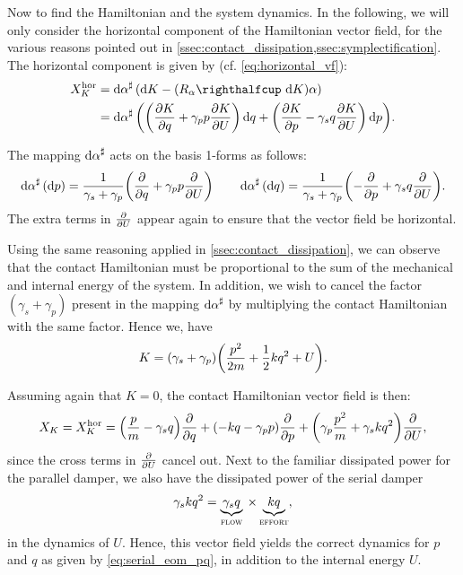 Now to find the Hamiltonian and the system dynamics. In the following, we will only consider the horizontal component of the Hamiltonian vector field, for the various reasons pointed out in \cref{ssec:contact_dissipation,ssec:symplectification}. The horizontal component is given by (cf. \cref{eq:horizontal_vf}):
\begin{equation}
    \begin{split}
        X^\text{hor}_K &= \fromDual{\dd{\alpha}}\qty(\dd{K} - (\intpr{R_\alpha}{\dd{K}})\alpha) \\
                       &= \fromDual{\dd{\alpha}}\qty(\qty(\pdv{K}{q} + \gamma_p p \pdv{K}{U})\dd{q} + \qty(\pdv{K}{p} - \gamma_s q \pdv{K}{U})\dd{p}).
    \end{split}
\end{equation}

The mapping $\dd{\alpha}^\sharp$ acts on the basis 1-forms as follows:
$$ 
    \dd{\alpha}^\sharp(\dd{p}) = \frac{1}{\gamma_s + \gamma_p}\qty(\pdv{}{q} + \gamma_p p\pdv{}{U}) \qquad
    \dd{\alpha}^\sharp(\dd{q}) = \frac{1}{\gamma_s + \gamma_p}\qty(-\pdv{}{p} + \gamma_s q\pdv{}{U}).
$$
The extra terms in $\pdv{}{U}$ appear again to ensure that the vector field be horizontal.

Using the same reasoning applied in \cref{ssec:contact_dissipation}, we can observe that the contact Hamiltonian must be proportional to the sum of the mechanical and internal energy of the system. In addition, we wish to cancel the factor $(\gamma_s + \gamma_p)$ present in the mapping $\dd{\alpha}^\sharp$ by multiplying the contact Hamiltonian with the same factor. Hence we, have
$$ 
    K = (\gamma_s + \gamma_p)\qty(\frac{p^2}{2m} + \frac{1}{2}kq^2 + U). 
$$

Assuming again that $K = 0$, the contact Hamiltonian vector field is then:
$$ 
    X_K = X_K^\text{hor} = \qty(\frac{p}{m} - \gamma_s q)\pdv{}{q} + \qty(-kq -\gamma_p p)\pdv{}{p} + \qty(\gamma_p\frac{p^2}{m} + \gamma_s kq^2 )\pdv{}{U}, 
$$
since the cross terms in $\pdv{}{U}$ cancel out. Next to the familiar dissipated power for the parallel damper, we also have the dissipated power of the serial damper
$$ \gamma_s kq^2 = \underbrace{\gamma_s q}_\text{\textsc{flow}} \: \times \underbrace{kq}_\text{\textsc{effort}}, $$ 
in the dynamics of $U$. Hence, this vector field yields the correct dynamics for $p$ and $q$ as given by \cref{eq:serial_eom_pq}, in addition to the internal energy $U$.

